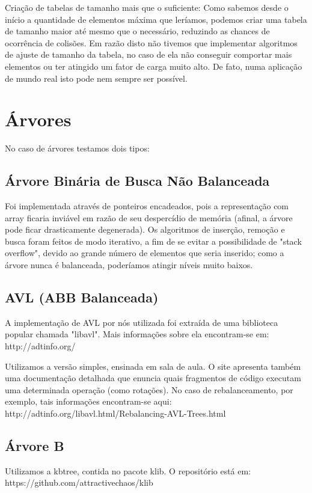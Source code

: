 \documentclass[twoside]{article}
\begin{document}
\begin{multicols}{2}
\begin{compactitem}
\item Criação de tabelas de tamanho mais que o suficiente:
   Como sabemos desde o início a quantidade de elementos máxima que leríamos, podemos criar uma tabela de tamanho maior até mesmo que o necessário, reduzindo as chances de ocorrência de colisões. Em razão disto não tivemos que implementar algoritmos de ajuste de tamanho da tabela, no caso de ela não conseguir comportar mais elementos ou ter atingido um fator de carga muito alto. De fato, numa aplicação de mundo real isto pode nem sempre ser possível.
\end{compactitem}





\section{Árvores}

No caso de árvores testamos dois tipos:
\subsection{ Árvore Binária de Busca Não Balanceada }
\indent Foi implementada através de ponteiros encadeados, pois a representação com array ficaria inviável em razão de seu despercídio de memória (afinal, a árvore pode ficar drasticamente degenerada). Os algoritmos de inserção, remoção e busca foram feitos de modo iterativo, a fim de se evitar a possibilidade de "stack overflow", devido ao grande número de elementos que seria inserido; como a árvore nunca é balanceada, poderíamos atingir níveis muito baixos.

\subsection{ AVL (ABB Balanceada) }
\indent A implementação de AVL por nós utilizada foi extraída de uma biblioteca popular chamada "libavl". Mais informações sobre ela encontram-se em: http://adtinfo.org/

\indent Utilizamos a versão simples, ensinada em sala de aula. O site apresenta também uma documentação detalhada que enuncia quais fragmentos de código executam uma determinada operação (como rotações). No caso de rebalanceamento, por exemplo, tais informações encontram-se aqui: 
   http://adtinfo.org/libavl.html/Rebalancing-AVL-Trees.html

\subsection{ Árvore B }
\indent	Utilizamos a kbtree, contida no pacote klib. O repositório está em: https://github.com/attractivechaos/klib
 

\end{multicols}
\end{document}
